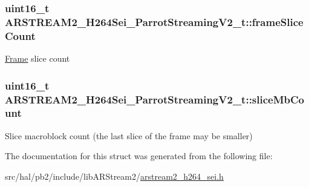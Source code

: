 \subsubsection[{\texorpdfstring{frame\+Slice\+Count}{frameSliceCount}}]{\setlength{\rightskip}{0pt plus 5cm}uint16\+\_\+t A\+R\+S\+T\+R\+E\+A\+M2\+\_\+\+H264\+Sei\+\_\+\+Parrot\+Streaming\+V2\+\_\+t\+::frame\+Slice\+Count}\hypertarget{struct_a_r_s_t_r_e_a_m2___h264_sei___parrot_streaming_v2__t_adcb6716da4a43e7041e08a77c700289d}{}\label{struct_a_r_s_t_r_e_a_m2___h264_sei___parrot_streaming_v2__t_adcb6716da4a43e7041e08a77c700289d}
\hyperlink{struct_frame}{Frame} slice count 
\subsubsection[{\texorpdfstring{slice\+Mb\+Count}{sliceMbCount}}]{\setlength{\rightskip}{0pt plus 5cm}uint16\+\_\+t A\+R\+S\+T\+R\+E\+A\+M2\+\_\+\+H264\+Sei\+\_\+\+Parrot\+Streaming\+V2\+\_\+t\+::slice\+Mb\+Count}\hypertarget{struct_a_r_s_t_r_e_a_m2___h264_sei___parrot_streaming_v2__t_a08b04142707156323072c10b1954f66b}{}\label{struct_a_r_s_t_r_e_a_m2___h264_sei___parrot_streaming_v2__t_a08b04142707156323072c10b1954f66b}
Slice macroblock count (the last slice of the frame may be smaller) 

The documentation for this struct was generated from the following file\+:\begin{DoxyCompactItemize}
\item 
src/hal/pb2/include/lib\+A\+R\+Stream2/\hyperlink{arstream2__h264__sei_8h}{arstream2\+\_\+h264\+\_\+sei.\+h}\end{DoxyCompactItemize}
